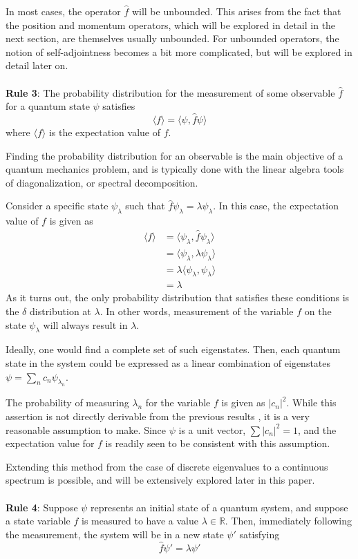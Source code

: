 In most cases, the operator $\hat{f}$ will be unbounded. This arises from the
fact that the position and momentum operators, which will be explored in detail
in the next section, are themselves usually unbounded. For unbounded operators,
the notion of self-adjointness becomes a bit more complicated, but will be
explored in detail later on.
\\
\\
\textbf{Rule 3}: The probability distribution for the measurement of some
observable $\hat{f}$ for a quantum state $\psi$ satisfies
\[
    \langle f \rangle = \langle \psi, \hat{f}\psi \rangle
\]
where $\langle f \rangle$ is the expectation value of $f$.


Finding the probability distribution for an observable is the main objective of
a quantum mechanics problem, and is typically done with the linear algebra tools
of diagonalization, or spectral decomposition.

Consider a specific state $\psi_{\lambda}$ such that
$\hat{f}\psi_{\lambda} = \lambda \psi_{\lambda}$.
In this case, the expectation value of $f$ is given as
\[
    \begin{aligned}
        \langle f \rangle &= \langle \psi_{\lambda},
        \hat{f}\psi_{\lambda} \rangle\\
        &= \langle \psi_{\lambda}, \lambda \psi_{\lambda} \rangle\\
        &= \lambda \langle \psi_{\lambda}, \psi_{\lambda} \rangle\\
        &= \lambda
    \end{aligned}
\]
As it turns out, the only probability distribution that satisfies these
conditions is the $\delta$ distribution at $\lambda$. In other words,
measurement of the variable $f$ on the state $\psi_{\lambda}$ will always
result in $\lambda$.

Ideally, one would find a complete set of such eigenstates. Then, each quantum
state in the system could be expressed as a linear combination of eigenstates 
$\psi = \sum_{n} c_n\psi_{\lambda_n}$.

The probability of measuring $\lambda_n$ for the variable $f$ is given as
$|c_n|^2$. While this assertion is not directly derivable from the previous
results \cite[p. 67]{Hall2013}, it is a very reasonable assumption to make. Since
$\psi$ is a unit vector, $\sum |c_n|^2 = 1$, and the expectation value for $f$
is readily seen to be consistent with this assumption.

Extending this method from the case of discrete eigenvalues to a continuous
spectrum is possible, and will be extensively explored later in this paper.
\\
\\
\textbf{Rule 4}: Suppose $\psi$ represents an initial state of a quantum system,
and suppose a state variable $f$ is measured to have a value $\lambda \in
\mathbb{R}$. Then, immediately following the measurement, the system will be in
a new state $\psi '$ satisfying
\[
    \hat{f}\psi ' = \lambda \psi '
\]

